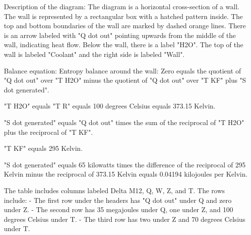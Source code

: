 Description of the diagram:
The diagram is a horizontal cross-section of a wall. The wall is represented by a rectangular box with a hatched pattern inside. The top and bottom boundaries of the wall are marked by dashed orange lines. There is an arrow labeled with "Q dot out" pointing upwards from the middle of the wall, indicating heat flow. Below the wall, there is a label "H2O". The top of the wall is labeled "Coolant" and the right side is labeled "Wall".

Balance equation: Entropy balance around the wall:
Zero equals the quotient of "Q dot out" over "T H2O" minus the quotient of "Q dot out" over "T KF" plus "S dot generated".

"T H2O" equals "T R" equals 100 degrees Celsius equals 373.15 Kelvin.

"S dot generated" equals "Q dot out" times the sum of the reciprocal of "T H2O" plus the reciprocal of "T KF".

"T KF" equals 295 Kelvin.

"S dot generated" equals 65 kilowatts times the difference of the reciprocal of 295 Kelvin minus the reciprocal of 373.15 Kelvin equals 0.04194 kilojoules per Kelvin.

The table includes columns labeled Delta M12, Q, W, Z, and T. The rows include:
- The first row under the headers has "Q dot out" under Q and zero under Z.
- The second row has 35 megajoules under Q, one under Z, and 100 degrees Celsius under T.
- The third row has two under Z and 70 degrees Celsius under T.